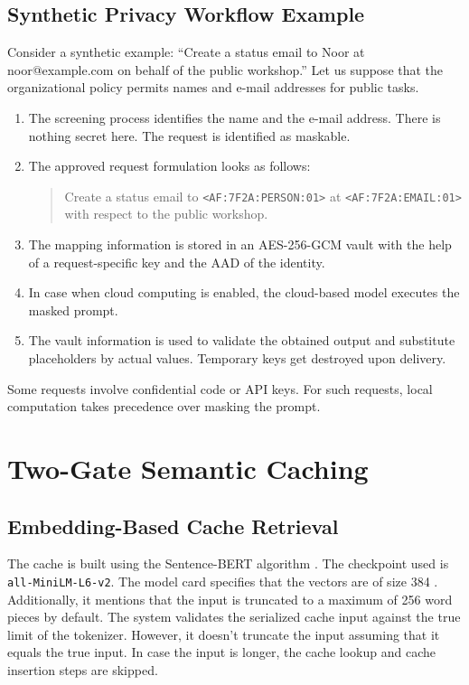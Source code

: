 \documentclass{FastFyp}
\begin{document}
\subsection{Synthetic Privacy Workflow Example}
Consider a synthetic example: ``Create a status email to Noor at noor@example.com on behalf of the public workshop.''
Let us suppose that the organizational policy permits names and e-mail addresses for public tasks.
\begin{enumerate}
\item The screening process identifies the name and the e-mail address. There is nothing secret here. The request is identified as maskable.
\item The approved request formulation looks as follows:
\begin{quote}\raggedright\small
Create a status email to \texttt{<AF:7F2A:PERSON:01>} at \texttt{<AF:7F2A:EMAIL:01>} with respect to the public workshop.
\end{quote}
\item The mapping information is stored in an AES-256-GCM vault with the help of a request-specific key and the AAD of the identity.
\item In case when cloud computing is enabled, the cloud-based model executes the masked prompt.
\item The vault information is used to validate the obtained output and substitute placeholders by actual values. Temporary keys get destroyed upon delivery.
\end{enumerate}
Some requests involve confidential code or API keys.
For such requests, local computation takes precedence over masking the prompt.

\section{Two-Gate Semantic Caching}
\label{sec:stage2-caching}
\subsection{Embedding-Based Cache Retrieval}
The cache is built using the Sentence-BERT algorithm \cite{ref:SBERT}.
The checkpoint used is \texttt{all-MiniLM-L6-v2}.
The model card specifies that the vectors are of size 384 \cite{ref:MiniLM}.
Additionally, it mentions that the input is truncated to a maximum of 256 word pieces by default.
The system validates the serialized cache input against the true limit of the tokenizer.
However, it doesn't truncate the input assuming that it equals the true input.
In case the input is longer, the cache lookup and cache insertion steps are skipped.
\end{document}
